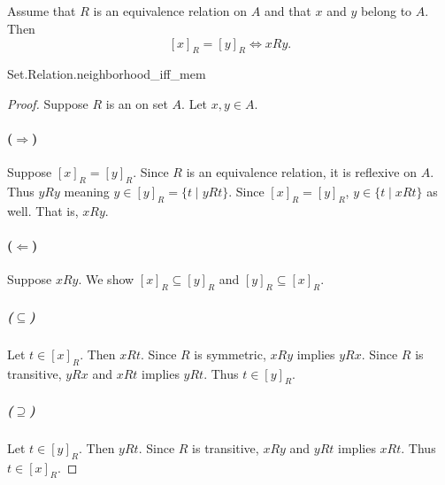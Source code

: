\documentclass{report}
\begin{document}
\subsection{}%

  \begin{lemma}[3N]
    Assume that $R$ is an equivalence relation on $A$ and that $x$ and $y$
      belong to $A$.
    Then $$[x]_R = [y]_R \iff xRy.$$
  \end{lemma}

    {Set.Relation.neighborhood\_iff\_mem}

  \begin{proof}
    Suppose $R$ is an  on set $A$.
    Let $x, y \in A$.

    \paragraph{($\Rightarrow$)}%

      Suppose $[x]_R = [y]_R$.
      Since $R$ is an equivalence relation, it is reflexive on $A$.
      Thus $yRy$ meaning $y \in [y]_R = \{t \mid yRt\}$.
      Since $[x]_R = [y]_R$, $y \in \{t \mid xRt\}$ as well.
      That is, $xRy$.

    \paragraph{($\Leftarrow$)}%

      Suppose $xRy$.
      We show $[x]_R \subseteq [y]_R$ and $[y]_R \subseteq [x]_R$.

      \subparagraph{($\subseteq$)}%

        Let $t \in [x]_R$.
        Then $xRt$.
        Since $R$ is symmetric, $xRy$ implies $yRx$.
        Since $R$ is transitive, $yRx$ and $xRt$ implies $yRt$.
        Thus $t \in [y]_R$.

      \subparagraph{($\supseteq$)}%

        Let $t \in [y]_R$.
        Then $yRt$.
        Since $R$ is transitive, $xRy$ and $yRt$ implies $xRt$.
        Thus $t \in [x]_R$.

  \end{proof}

\subsection{}%
\end{document}
